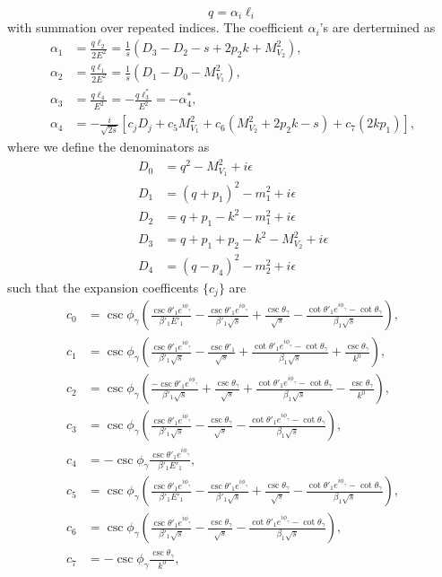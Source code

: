 \begin{equation}
q=\alpha_i\ell_i
\end{equation}
with summation over repeated indices. The coefficient $\alpha_i$'s are dertermined as
\begin{align}
\alpha_1&=\frac{q\ell_2}{2E^2}=\frac{1}{s}(D_3-D_2-s+2p_2k+M^2_{V_2}),\nonumber\\
\alpha_2&=\frac{q\ell_1}{2E^2}=\frac{1}{s}(D_1-D_0-M^2_{V_1}),\nonumber\\
\alpha_3&=\frac{q\ell_4}{E^2}=-\frac{q\ell_3^\ast}{E^2}=-\alpha_4^\ast,\nonumber\\
\alpha_4&=-\frac{i}{\sqrt{2s}}[c_jD_j+c_5M_{V_1}^2+c_6(M^2_{V_2}+2p_2k-s)+c_7(2kp_1)],
\end{align}
where we define the denominators as
\begin{align}
D_0&=q^2-M^2_{V_1}+i\epsilon\nonumber\\
D_1&=(q+p_1)^2-m_1^2+i\epsilon\nonumber\\
D_2&={q+p_1-k}^2-m^2_{1}+i\epsilon\nonumber\\
D_3&={q+p_1+p_2-k}^2-M^2_{V_2}+i\epsilon\nonumber\\
D_4&=(q-p_4)^2-m^2_2+i\epsilon
\end{align}
such that the expansion coefficents $\{c_j\}$ are
\begin{align}
c_0&=\csc\phi_\gamma\left(\frac{\csc\theta'_1e^{i\phi_\gamma}}{\beta'_1E'_1}-\frac{\csc\theta'_1e^{i\phi_\gamma}}{\beta'_1\sqrt{s}}+\frac{\csc\theta_\gamma}{\sqrt{s}}-\frac{\cot\theta'_1e^{i\phi_\gamma}-\cot\theta_\gamma}{\beta_1\sqrt{s}} \right),\nonumber\\
c_1&=\csc\phi_\gamma\left(\frac{\csc\theta'_1e^{i\phi_\gamma}}{\beta'_1\sqrt{s}}-\frac{\csc\theta'_1}{\sqrt{s}}+\frac{\cot\theta'_1e^{i\phi_\gamma}-\cot\theta_\gamma}{\beta_1\sqrt{s}}+\frac{\csc\theta_\gamma}{k^0} \right),\nonumber\\
c_2&=\csc\phi_\gamma\left(\frac{-\csc\theta'_1e^{i\phi_\gamma}}{\beta'_1\sqrt{s}}+\frac{\csc\theta_\gamma}{\sqrt{s}}+\frac{\cot\theta'_1e^{i\phi_\gamma}-\cot\theta_\gamma}{\beta_1\sqrt{s}}-\frac{\csc\theta_\gamma}{k^0} \right),\nonumber\\
c_3&=\csc\phi_\gamma\left(\frac{\csc\theta'_1e^{i\phi_\gamma}}{\beta'_1\sqrt{s}}-\frac{\csc\theta_\gamma}{\sqrt{s}}-\frac{\cot\theta'_1e^{i\phi_\gamma}-\cot\theta_\gamma}{\beta_1\sqrt{s}}\right),\nonumber\\
c_4&=-\csc\phi_\gamma\frac{\csc\theta'_1e^{i\phi_\gamma}}{\beta'_1E'_1},\nonumber\\
c_5&=\csc\phi_\gamma\left(\frac{\csc\theta'_1e^{i\phi_\gamma}}{\beta'_1E'_1}-\frac{\csc\theta'_1e^{i\phi_\gamma}}{\beta'_1\sqrt{s}}+\frac{\csc\theta_\gamma}{\sqrt{s}}-\frac{\cot\theta'_1e^{i\phi_\gamma}-\cot\theta_\gamma}{\beta_1\sqrt{s}} \right),\nonumber\\
c_6&=\csc\phi_\gamma\left(\frac{\csc\theta'_1e^{i\phi_\gamma}}{\beta'_1\sqrt{s}}-\frac{\csc\theta_\gamma}{\sqrt{s}}-\frac{\cot\theta'_1e^{i\phi_\gamma}-\cot\theta_\gamma}{\beta_1\sqrt{s}}\right),\nonumber\\
c_7&=-\csc\phi_\gamma\frac{\csc\theta_\gamma}{k^0},
\end{align}
